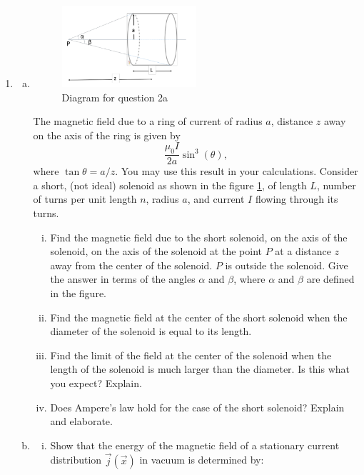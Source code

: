 \documentclass[12pt,geometry,width=8in]{article}
\begin{document}
\begin{enumerate}[(1),topsep=0pt,itemsep=0ex,partopsep=1ex,parsep=1ex]
\item
\begin{enumerate}[(a)]
\item
\begin{figure}[h]
    \centering
    \includegraphics[width=0.5\textwidth]{solenoid}
    \caption{Diagram for question 2a}
    \label{solenoid}
\end{figure}
The magnetic field due to a ring of current of radius $a$, distance $z$ away on the axis of the ring is given by
\[
\frac{\mu_0I}{2a} \sin^3(\theta),
\]
where $\tan\theta = a/z$.  You may use this result in your calculations. Consider a short, (not ideal) solenoid as shown in the figure \ref{solenoid}, of length $L$, number of turns per unit length $n$, radius $a$, and current $I$ flowing through its turns.

\begin{enumerate}[(i)]
\item Find the magnetic field due to the short solenoid, on the axis of the solenoid, on the axis of the solenoid at the point $P$ at a distance $z$ away from the center of the solenoid. $P$ is outside the solenoid. Give the answer in terms of the angles $\alpha$ and $\beta$, where $\alpha$ and $\beta$ are defined in the figure.
\item
Find the magnetic field at the center of the short solenoid when the diameter of the solenoid is equal to its length.
\item
Find the limit of the field at the center of the solenoid when the length of the solenoid is much larger than the diameter. Is this what you expect? Explain.
\item
Does Ampere's law hold for the case of the short solenoid? Explain and elaborate.
\end{enumerate}
\newpage

\item
\begin{enumerate}[(i)]
\item
Show that the energy of the magnetic field of a stationary current distribution $\vec{j}(\vec{x})$ in vacuum is determined by:


\end{enumerate}
\end{enumerate}
\end{enumerate}
\end{document}

